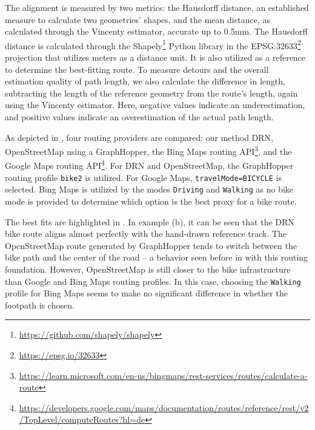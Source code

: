 The alignment is measured by two metrics: the Hausdorff distance, an established measure to calculate two geometries' shapes, and the mean distance, as calculated through the Vincenty estimator, accurate up to 0.5mm. The Hausdorff distance is calculated through the Shapely\footnote{\url{https://github.com/shapely/shapely}} Python library in the EPSG:32633\footnote{\url{https://epsg.io/32633}} projection that utilizes meters as a distance unit. It is also utilized as a reference to determine the best-fitting route. To measure detours and the overall estimation quality of path length, we also calculate the difference in length, subtracting the length of the reference geometry from the route's length, again using the Vincenty estimator. Here, negative values indicate an underestimation, and positive values indicate an overestimation of the actual path length.

As depicted in , four routing providers are compared: our method DRN, OpenStreetMap using a GraphHopper, the Bing Maps routing API\footnote{\url{https://learn.microsoft.com/en-us/bingmaps/rest-services/routes/calculate-a-route}}, and the Google Maps routing API\footnote{\url{https://developers.google.com/maps/documentation/routes/reference/rest/v2/TopLevel/computeRoutes?hl=de}}. For DRN and OpenStreetMap, the GraphHopper routing profile \texttt{bike2} is utilized. For Google Maps, \texttt{travelMode=\allowbreak BICYCLE} is selected. Bing Maps is utilized by the modes \texttt{Driving} and \texttt{Walking} as no bike mode is provided to determine which option is the best proxy for a bike route.

The best fits are highlighted in . In example (b), it can be seen that the DRN bike route aligns almost perfectly with the hand-drawn reference track. The OpenStreetMap route generated by GraphHopper tends to switch between the bike path and the center of the road -- a behavior seen before in  with this routing foundation. However, OpenStreetMap is still closer to the bike infrastructure than Google and Bing Maps routing profiles. In this case, choosing the \texttt{Walking} profile for Bing Maps seems to make no significant difference in whether the footpath is chosen.

